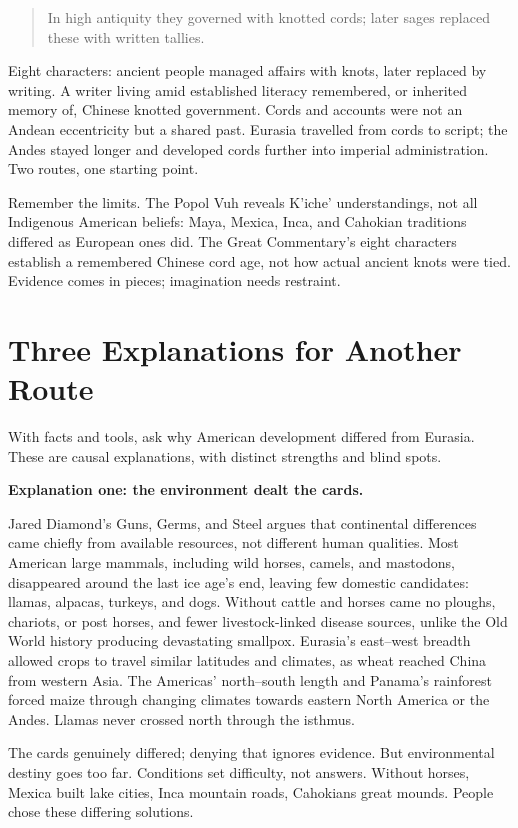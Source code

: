 \begin{quote}
In high antiquity they governed with knotted cords; later sages replaced these with written tallies.
\end{quote}
Eight characters: ancient people managed affairs with knots, later replaced by writing. A writer living amid established literacy remembered, or inherited memory of, Chinese knotted government. Cords and accounts were not an Andean eccentricity but a shared past. Eurasia travelled from cords to script; the Andes stayed longer and developed cords further into imperial administration. Two routes, one starting point.

Remember the limits. The Popol Vuh reveals K'iche' understandings, not all Indigenous American beliefs: Maya, Mexica, Inca, and Cahokian traditions differed as European ones did. The Great Commentary's eight characters establish a remembered Chinese cord age, not how actual ancient knots were tied. Evidence comes in pieces; imagination needs restraint.

\section{Three Explanations for Another Route}
With facts and tools, ask why American development differed from Eurasia. These are causal explanations, with distinct strengths and blind spots.

\textbf{Explanation one: the environment dealt the cards.}

Jared Diamond's Guns, Germs, and Steel argues that continental differences came chiefly from available resources, not different human qualities. Most American large mammals, including wild horses, camels, and mastodons, disappeared around the last ice age's end, leaving few domestic candidates: llamas, alpacas, turkeys, and dogs. Without cattle and horses came no ploughs, chariots, or post horses, and fewer livestock-linked disease sources, unlike the Old World history producing devastating smallpox. Eurasia's east--west breadth allowed crops to travel similar latitudes and climates, as wheat reached China from western Asia. The Americas' north--south length and Panama's rainforest forced maize through changing climates towards eastern North America or the Andes. Llamas never crossed north through the isthmus.

The cards genuinely differed; denying that ignores evidence. But environmental destiny goes too far. Conditions set difficulty, not answers. Without horses, Mexica built lake cities, Inca mountain roads, Cahokians great mounds. People chose these differing solutions.

